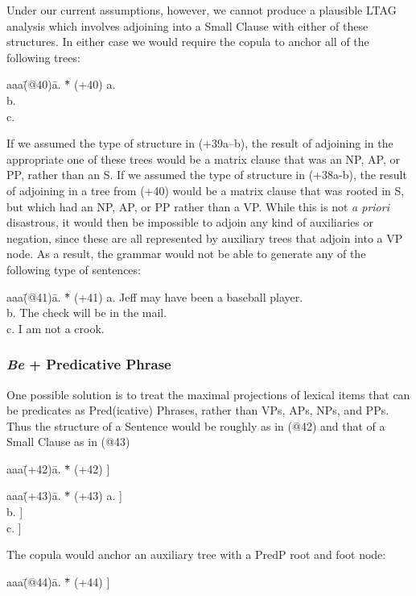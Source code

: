 Under our current assumptions, however, we cannot produce a plausible
LTAG analysis which involves adjoining into a Small Clause with either
of these structures.  In either case we would require the copula to
anchor all of the following trees:
\begin{tabbing}
aaa\=(@40)\= a. \= *\= \kill
   \>(+40)\> a. \>  \> [$_{NP}$ Cop NP]      \\
   \>  \>    b. \>  \> [$_{AP}$ Cop AP]      \\
   \>  \>    c. \>  \> [$_{PP}$ Cop PP]      
\end{tabbing}
If we assumed the type of structure in (+39a--b), the result of
adjoining in the appropriate one of these trees would be a matrix clause
that was an NP, AP, or PP, rather than an S.  If we assumed the type of
structure in (+38a-b), the result of adjoining in a tree from (+40) would
be a matrix clause that was rooted in S, but which had an NP, AP, or PP
rather than a VP.  While this is not {\em a priori} disastrous, it would
then be impossible to adjoin any kind of auxiliaries or negation, since
these are all represented by auxiliary trees that adjoin into a VP node.
As a result, the grammar would not be able to generate any of the
following type of sentences:
\begin{tabbing}
aaa\=(@41)\= a. \= *\= \kill
   \>(+41)\> a. \>  \> Jeff may have been a baseball player.    \\
   \>     \> b. \>  \> The check will be in the mail. \\
   \>     \> c. \>  \> I am not a crook.
\end{tabbing}




\subsubsection{{\em Be\/} + Predicative Phrase}            

\label{bep}
One possible solution is to treat the maximal projections of lexical
items that can be predicates as Pred(icative) Phrases, rather than VPs,
APs, NPs, and PPs. Thus the structure of a Sentence would be roughly as
in (@42) and that of a Small Clause as in (@43)
\begin{tabbing}
aaa\=(+42)\= a. \= *\= \kill
   \>(+42)\>    \>  \> [$_{S}$ NP [$_{PredP}$ V \ldots\ ]]       
\end{tabbing}
\begin{tabbing}
aaa\=(+43)\= a. \= *\= \kill
   \>(+43)\> a. \>  \> [$_{S}$ NP [$_{PredP}$ A \ldots\ ]]       \\
   \>     \> b. \>  \> [$_{S}$ NP [$_{PredP}$ N \ldots\ ]]       \\
   \>     \> c. \>  \> [$_{S}$ NP [$_{PredP}$ P \ldots\ ]]       
\end{tabbing}
The copula would anchor an auxiliary tree with a PredP root and foot node:
\begin{tabbing}
aaa\=(@44)\= a. \= *\= \kill
   \>(+44)\>    \>  \> [$_{PredP}$ [$_{V}$ be] [$_{PredP}$ ]]    
\end{tabbing}

